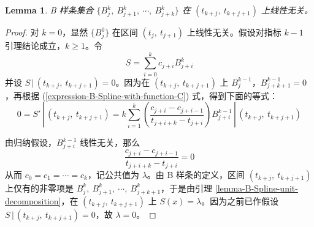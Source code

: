 \documentclass[a4paper]{article}
\newtheorem{lemma}{Lemma}
\begin{document}
    \begin{lemma}
    \label{lemma-B-Spline-linear-independence-1}
        B 样条集合 $\{B_{j}^{k},\ B_{j+1}^{k},\ \cdots,\ B_{j+k}^{k}\}$ 在 $(t_{k+j},\ t_{k+j+1})$ 上线性无关。
    \end{lemma}
    \begin{proof}[Proof]
        对 $k = 0$，显然 $\{B_j^0\}$ 在区间 $(t_{j},\ t_{j+1})$ 上线性无关。假设对指标 $k - 1$ 引理结论成立，$k \geqslant 1$。令
        \begin{equation}
            S = \sum_{i = 0}^{k} c_{j+i} B_{j+i}^{k}
        \end{equation}
        并设 $S\,|\,(t_{k+j},\ t_{k+j+1}) = 0$。因为在 $(t_{k+j},\ t_{k+j+1})$ 上 $B_{j}^{k-1}$，$B_{j+k+1}^{k-1} = 0$，再根据 (\ref{expression-B-Spline-with-function-C}) 式，得到下面的等式：
        \begin{equation}
            0 = S'\,|\,(t_{k+j},\ t_{k+j+1}) = k \sum_{i = 1}^{k} \left(\frac{c_{j+i} - c_{j+i-1}}{t_{j+i+k} - t_{j+i}}\right) B_{j+i}^{k-1}\,|\,(t_{k+j},\ t_{k+j+1})
        \end{equation}
         
        \noindent 由归纳假设，$B_{j+i}^{k-1}$ 线性无关，那么
        \begin{equation}
            \frac{c_{j+i} - c_{j+i-1}}{t_{j+i+k} - t_{j+i}} = 0
        \end{equation}
        从而 $c_0 = c_1 = \cdots = c_k$，记公共值为 $\lambda$。由 B 样条的定义，区间 $(t_{k+j},\ t_{k+j+1})$ 上仅有的非零项是 $B_{j}^{k},\ B_{j+1}^{k},\ \cdots,\ B_{j+k+1}^{k}$，于是由引理 \ref{lemma-B-Spline-unit-decomposition}，在 $(t_{k+j},\ t_{k+j+1})$ 上 $S(x) = \lambda$。因为之前已作假设 $S\,|\,(t_{k+j},\ t_{k+j+1}) = 0$，故 $\lambda = 0$。
    \end{proof}
    
\end{document}
